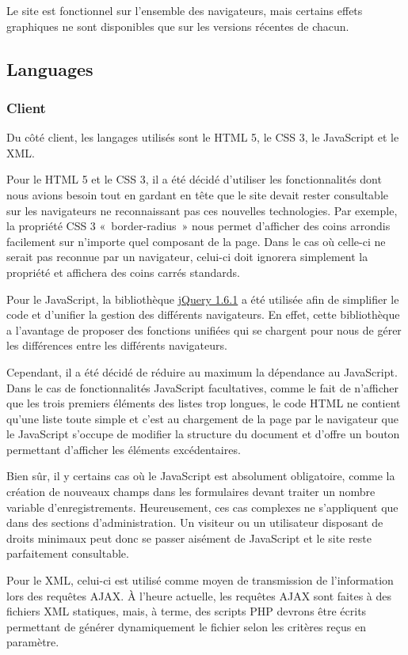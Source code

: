 \documentclass[letter, 11pt]{report}
\begin{document}
Le site est fonctionnel sur l'ensemble des navigateurs, mais certains effets graphiques ne sont disponibles que sur les versions récentes de chacun.

\subsection{Languages}
\subsubsection{Client}
Du côté client, les langages utilisés sont le HTML 5, le CSS 3, le JavaScript et le XML.

Pour le HTML 5 et le CSS 3, il a été décidé d'utiliser les fonctionnalités dont nous avions besoin tout en gardant en tête que le site devait rester consultable sur les navigateurs ne reconnaissant pas ces nouvelles technologies. Par exemple, la propriété CSS 3 «~border-radius~» nous permet d'afficher des coins arrondis facilement sur n'importe quel composant de la page. Dans le cas où celle-ci ne serait pas reconnue par un navigateur, celui-ci doit ignorera simplement la propriété et affichera des coins carrés standards.

Pour le JavaScript, la bibliothèque \href{http://jquery.com/}{jQuery 1.6.1} a été utilisée afin de simplifier le code et d'unifier la gestion des différents navigateurs. En effet, cette bibliothèque a l'avantage de proposer des fonctions unifiées qui se chargent pour nous de gérer les différences entre les différents navigateurs.

Cependant, il a été décidé de réduire au maximum la dépendance au JavaScript. Dans le cas de fonctionnalités JavaScript facultatives, comme le fait de n'afficher que les trois premiers éléments des listes trop longues, le code HTML ne contient qu'une liste toute simple et c'est au chargement de la page par le navigateur que le JavaScript s'occupe de modifier la structure du document et d'offre un bouton permettant d'afficher les éléments excédentaires.

Bien sûr, il y certains cas où le JavaScript est absolument obligatoire, comme la création de nouveaux champs dans les formulaires devant traiter un nombre variable d'enregistrements. Heureusement, ces cas complexes ne s'appliquent que dans des sections d'administration. Un visiteur ou un utilisateur disposant de droits minimaux peut donc se passer aisément de JavaScript et le site reste parfaitement consultable.

Pour le XML, celui-ci est utilisé comme moyen de transmission de l'information lors des requêtes AJAX. À l'heure actuelle, les requêtes AJAX sont faites à des fichiers XML statiques, mais, à terme, des scripts PHP devrons être écrits permettant de générer dynamiquement le fichier selon les critères reçus en paramètre.
\end{document}
